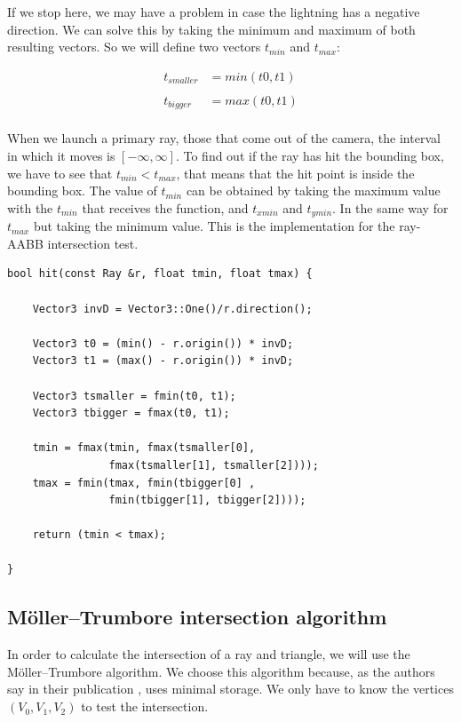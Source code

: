 \documentclass[titlepage,12pt]{report}
\begin{document}
If we stop here, we may have a problem in case the lightning has a negative direction. We can solve this by taking the minimum and maximum of both resulting vectors. So we will define two vectors $t_{min}$ and $t_{max}$:

\begin{equation} \label{slab_method_3}
\begin{split}
t_{smaller} & = min(t0, t1) \\
\\
t_{bigger} & = max(t0, t1) \\
\end{split} 
\end{equation}

When we launch a primary ray, those that come out of the camera, the interval in which it moves is $[-\infty, \infty]$. To find out if the ray has hit the bounding box, we have to see that $t_{min} < t_{max}$, that means that the hit point is inside the bounding box. The value of $t_{min}$ can be obtained by taking the maximum value with the $t_{min}$ that receives the function, and $t_{xmin}$ and $t_{ymin}$. In the same way for $t_{max}$ but taking the minimum value. This is the implementation for the ray-AABB intersection test.

\begin{lstlisting}
bool hit(const Ray &r, float tmin, float tmax) {
  	
  	Vector3 invD = Vector3::One()/r.direction();
    
    Vector3 t0 = (min() - r.origin()) * invD;
    Vector3 t1 = (max() - r.origin()) * invD;
    
    Vector3 tsmaller = fmin(t0, t1);
    Vector3 tbigger = fmax(t0, t1);
    
    tmin = fmax(tmin, fmax(tsmaller[0], 
    			fmax(tsmaller[1], tsmaller[2])));
    tmax = fmin(tmax, fmin(tbigger[0] , 
    			fmin(tbigger[1], tbigger[2])));
    
    return (tmin < tmax);
    
}
\end{lstlisting}

\subsection{Möller–Trumbore intersection algorithm}

In order to calculate the intersection of a ray and triangle, we will use the Möller–Trumbore algorithm. We choose this algorithm because, as the authors say in their publication \citep{Moller2005}, uses minimal storage. We only have to know the vertices $(V_0,V_1,V_2)$ to test the intersection.
\end{document}
